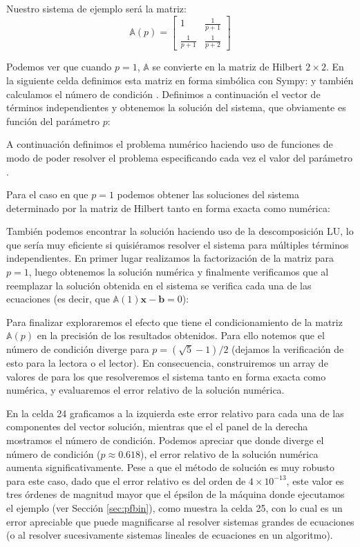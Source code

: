 Nuestro sistema de ejemplo será la matriz:
\[ 
\mathbb{A}(p) = 
\begin{bmatrix}
 1 & \frac{1}{p+1} \\
 \frac{1}{p+1} & \frac{1}{p+2}
\end{bmatrix}
\]

Podemos ver que cuando $p = 1$, $\mathbb{A}$ se convierte en la matriz de Hilbert $2 \times 2$. En la siguiente celda definimos esta matriz en forma simbólica con Sympy:
y también calculamos el número de condición . Definimos a continuación el vector de términos independientes y obtenemos la solución del sistema, que obviamente es función del parámetro $p$:

A continuación definimos el problema numérico haciendo uso de funciones  de modo de poder resolver el problema especificando cada vez el valor del parámetro .

Para el caso en que $p=1$ podemos obtener las soluciones del sistema determinado por la matriz de Hilbert tanto en forma exacta como numérica:

También podemos encontrar la solución haciendo uso de la descomposición LU, lo que sería muy eficiente si quisiéramos resolver el sistema para múltiples términos independientes. En primer lugar realizamos la factorización de la matriz  para $p = 1$, luego obtenemos la solución numérica  y finalmente verificamos que al reemplazar la solución obtenida en el sistema se verifica cada una de las ecuaciones (es decir, que $\mathbb{A}(1) \bm{x} - \bm{b} = 0$):

Para finalizar exploraremos el efecto que tiene el condicionamiento de la matriz $\mathbb{A}(p)$ en la precisión de los resultados obtenidos. Para ello notemos que el número de condición diverge para $p = (\sqrt{5} - 1)/2$ (dejamos la verificación de esto para la lectora o el lector). En consecuencia, construiremos un array de valores de  para los que resolveremos el sistema tanto en forma exacta como numérica, y evaluaremos el error relativo de la solución numérica. 

En la celda 24 graficamos a la izquierda este error relativo para cada una de las componentes del vector solución, mientras que el el panel de la derecha mostramos el número de condición. Podemos apreciar que donde diverge el número de condición ($p \approx 0.618$), el error relativo de la solución numérica aumenta significativamente. Pese a que el método de solución es muy robusto para este caso, dado que el error relativo es del orden de $4 \times 10^{-13}$, este valor es tres órdenes de magnitud mayor que el épsilon de la máquina donde ejecutamos el ejemplo (ver Sección \ref{sec:pfbin}), como muestra la celda 25, con lo cual es un error apreciable que puede magnificarse al resolver sistemas grandes de ecuaciones (o al resolver sucesivamente sistemas lineales de ecuaciones en un algoritmo).

